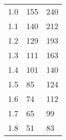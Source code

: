 \begin{table}[H]
{\begin{tabular}{|l|l|l|}
1.0                      & 155                                                                                                                  & 240                                                                                                                    \\
1.1                      & 140                                                                                                                  & 212                                                                                                                    \\
1.2                      & 129                                                                                                                  & 193                                                                                                                    \\
1.3                      & 111                                                                                                                  & 163                                                                                                                    \\
1.4                      & 101                                                                                                                  & 140                                                                                                                    \\
1.5                      & 85                                                                                                                   & 124                                                                                                                    \\
1.6                      & 74                                                                                                                   & 112                                                                                                                    \\
1.7                      & 65                                                                                                                   & 99                                                                                                                     \\
1.8                      & 51                                                                                                                   & 83                                                                                                                     \\

\end{tabular}}
\end{table}
